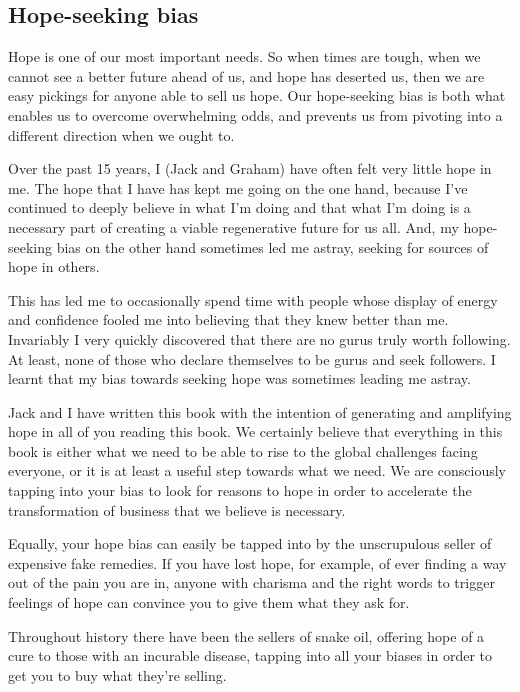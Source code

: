 \subsection{Hope-seeking bias}
Hope  is one of our most important needs. So when times are tough, when we cannot see a better future ahead of us, and hope has deserted us, then we are easy pickings for anyone able to sell us hope. Our hope-seeking bias is both what enables us to overcome overwhelming odds, and prevents us from pivoting into a different direction when we ought to.


\begin{longstoryblock}
Over the past 15 years, I (Jack and Graham) have often felt very little hope in me. The hope that I have has kept me going on the one hand, because I've continued to deeply believe in what I'm doing and that what I'm doing is a necessary part of creating a viable regenerative future for us all. And, my hope-seeking bias on the other hand sometimes led me astray, seeking for sources of hope in others. 


This has led me to occasionally spend time with people whose display of energy and confidence fooled me into believing that they knew better than me. Invariably I very quickly discovered that there are no gurus truly worth following. At least, none of those who declare themselves to be gurus and seek followers. I learnt that my bias towards seeking hope was sometimes leading me astray.
\end{longstoryblock}


Jack and I have written this book with the intention of generating and amplifying hope in all of you reading this book. We certainly believe that everything in this book is either what we need to be able to rise to the global challenges facing everyone, or it is at least a useful step towards what we need. We are consciously tapping into your bias to look for reasons to hope in order to accelerate the transformation of business that we believe is necessary.


Equally, your hope bias can easily be tapped into by the unscrupulous seller of expensive fake remedies. If you have lost hope, for example, of ever finding a way out of the pain you are in, anyone with charisma and the right words to trigger feelings of hope can convince you to give them what they ask for. 


Throughout history there have been the sellers of snake oil, offering hope of a cure to those with an incurable disease, tapping into all your biases in order to get you to buy what they're selling. 


